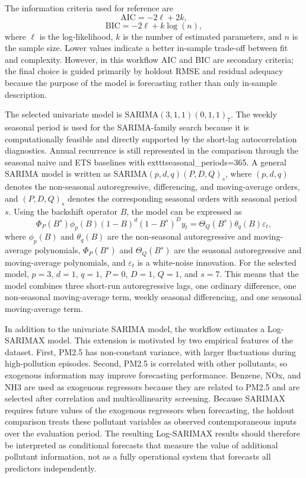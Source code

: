 \documentclass[11pt]{article}
\begin{document}
The information criteria used for reference are
\[
\mathrm{AIC}=-2\ell+2k,
\]
\[
\mathrm{BIC}=-2\ell+k\log(n),
\]
where $\ell$ is the log-likelihood, $k$ is the number of estimated parameters, and $n$ is the sample size. Lower values indicate a better in-sample trade-off between fit and complexity. However, in this workflow AIC and BIC are secondary criteria; the final choice is guided primarily by holdout RMSE and residual adequacy because the purpose of the model is forecasting rather than only in-sample description.

The selected univariate model is SARIMA$(3,1,1)(0,1,1)_7$. The weekly seasonal period is used for the SARIMA-family search because it is computationally feasible and directly supported by the short-lag autocorrelation diagnostics. Annual recurrence is still represented in the comparison through the seasonal naive and ETS baselines with 	exttt{seasonal\_periods=365}. A general SARIMA model is written as SARIMA$(p,d,q)(P,D,Q)_s$, where $(p,d,q)$ denotes the non-seasonal autoregressive, differencing, and moving-average orders, and $(P,D,Q)_s$ denotes the corresponding seasonal orders with seasonal period $s$. Using the backshift operator $B$, the model can be expressed as
\[
\Phi_P(B^s)\phi_p(B)(1-B)^d(1-B^s)^D y_t
= \Theta_Q(B^s)\theta_q(B)\varepsilon_t,
\]
where $\phi_p(B)$ and $\theta_q(B)$ are the non-seasonal autoregressive and moving-average polynomials, $\Phi_P(B^s)$ and $\Theta_Q(B^s)$ are the seasonal autoregressive and moving-average polynomials, and $\varepsilon_t$ is a white-noise innovation. For the selected model, $p=3$, $d=1$, $q=1$, $P=0$, $D=1$, $Q=1$, and $s=7$. This means that the model combines three short-run autoregressive lags, one ordinary difference, one non-seasonal moving-average term, weekly seasonal differencing, and one seasonal moving-average term.

In addition to the univariate SARIMA model, the workflow estimates a Log-SARIMAX model. This extension is motivated by two empirical features of the dataset. First, PM2.5 has non-constant variance, with larger fluctuations during high-pollution episodes. Second, PM2.5 is correlated with other pollutants, so exogenous information may improve forecasting performance. Benzene, NOx, and NH3 are used as exogenous regressors because they are related to PM2.5 and are selected after correlation and multicollinearity screening. Because SARIMAX requires future values of the exogenous regressors when forecasting, the holdout comparison treats these pollutant variables as observed contemporaneous inputs over the evaluation period. The resulting Log-SARIMAX results should therefore be interpreted as conditional forecasts that measure the value of additional pollutant information, not as a fully operational system that forecasts all predictors independently.
\end{document}
